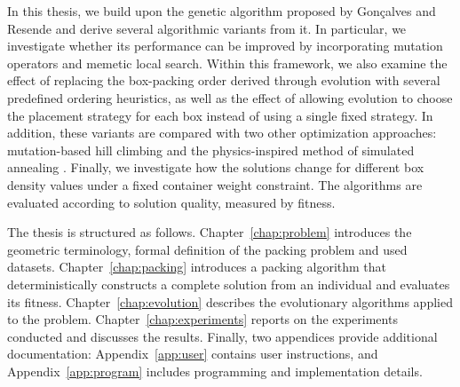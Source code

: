 In this thesis, we build upon the genetic algorithm proposed by Gonçalves and Resende \cite{goncalves2013} and derive several 
algorithmic variants from it. In particular, we investigate whether its performance can be improved by 
incorporating mutation operators and memetic local search. Within this framework, 
we also examine the effect of replacing the box-packing order derived through evolution with several 
predefined ordering heuristics, as well as the effect of allowing evolution to choose the placement strategy 
for each box instead of using a single fixed strategy. In addition, these variants are compared with two other 
optimization approaches: mutation-based hill climbing and the physics-inspired method of simulated annealing \cite{eiben2016}. 
Finally, we investigate how the solutions change for different box density values under a fixed container weight constraint. 
The algorithms are evaluated according to solution quality, measured by fitness.

The thesis is structured as follows. 
Chapter~\ref{chap:problem} introduces the geometric terminology, formal definition of the packing problem and used datasets. 
Chapter~\ref{chap:packing} introduces a packing algorithm that deterministically constructs a complete solution from an individual and evaluates its fitness.
Chapter~\ref{chap:evolution} describes the evolutionary algorithms applied to the problem. 
Chapter~\ref{chap:experiments} reports on the experiments conducted and discusses the results. 
Finally, two appendices provide additional documentation: 
Appendix~\ref{app:user} contains user instructions, and Appendix~\ref{app:program} includes programming and implementation details.